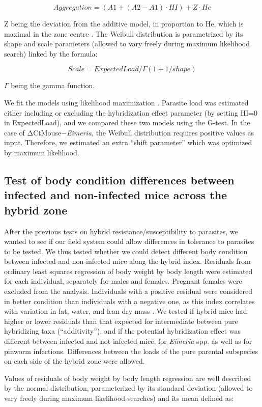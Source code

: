 \begin{equation}
Aggregation=(A1 + (A2 − A1) · HI) + Z · He
\end{equation}

Z being the deviation from the additive model, in proportion to He, which is maximal in the zone centre \citep{baird_where_2012}. The Weibull distribution is parametrized by its shape and scale parameters (allowed to vary freely during maximum likelihood search) linked by the formula:

\begin{equation}
Scale=ExpectedLoad / \Gamma (1 + 1/ shape)
\end{equation}

$\Gamma$ being the gamma function. 
\par We fit the models using likelihood maximization \parencite[using the R package mle2;][]{bolker_bbmle_2017}. Parasite load was estimated either including or excluding the hybridization effect parameter (by setting HI=0 in ExpectedLoad), and we compared these two models using the G-test. In the case of ΔCtMouse−\textit{Eimeria}, the Weibull distribution requires positive values as input. Therefore, we estimated an extra “shift parameter” which was optimized by maximum likelihood.

\subsection{Test of body condition differences between infected and non-infected mice across the hybrid zone}
After the previous tests on hybrid resistance/susceptibility to parasites, we wanted to see if our field system could allow differences in tolerance to parasites to be tested. We thus tested whether we could detect different body condition between infected and non-infected mice along the hybrid index. Residuals from ordinary least squares regression of body weight by body length were estimated for each individual, separately for males and females. Pregnant females were excluded from the analysis. Individuals with a positive residual were considered in better condition than individuals with a negative one, as this index correlates with variation in fat, water, and lean dry mass \citep{schulte-hostedde_restitution_2005}. We tested if hybrid mice had higher or lower residuals than that expected for intermediate between pure hybridizing taxa (“additivity”), and if the potential hybridization effect was different between infected and not infected mice, for \textit{Eimeria} spp. as well as for pinworm infections. Differences between the loads of the pure parental subspecies on each side of the hybrid zone were allowed.
\par Values of residuals of body weight by body length regression are well described by the normal distribution, parameterized by its standard deviation (allowed to vary freely during maximum likelihood searches) and its mean defined as:

